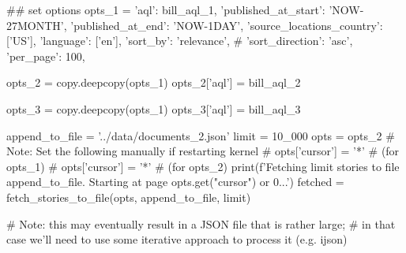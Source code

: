 \begin{pyin}
\## set options
opts_1 = {
    'aql': bill_aql_1,
    'published_at_start': 'NOW-27MONTH',
    'published_at_end': 'NOW-1DAY',
    'source_locations_country': ['US'],
    'language': ['en'],
    'sort_by': 'relevance',
    # 'sort_direction': 'asc',
    'per_page': 100,
}

opts_2 = copy.deepcopy(opts_1)
opts_2['aql'] = bill_aql_2

opts_3 = copy.deepcopy(opts_1)
opts_3['aql'] = bill_aql_3
\end{pyin}

\begin{pyin}
append_to_file = '../data/documents_2.json'
limit = 10_000
opts = opts_2
# Note: Set the following manually if restarting kernel
# opts['cursor'] = '*' # (for opts_1)
# opts['cursor'] = '*' # (for opts_2)
print(f'Fetching {limit} stories to file {append_to_file}. Starting at page {opts.get("cursor") or 0}...')
fetched = fetch_stories_to_file(opts, append_to_file, limit)

# Note: this may eventually result in a JSON file that is rather large;
# in that case we'll need to use some iterative approach to process it (e.g. ijson)
\end{pyin}

